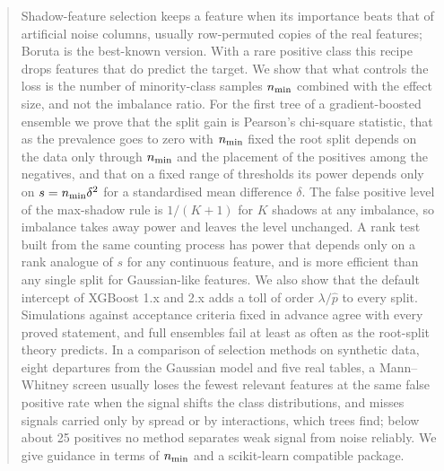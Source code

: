 \begin{abstract}
Shadow-feature selection keeps a feature when its importance beats that of artificial noise columns, usually row-permuted copies of the real features; Boruta is the best-known version. With a rare positive class this recipe drops features that do predict the target. We show that what controls the loss is the number of minority-class samples $\nmin$ combined with the effect size, and not the imbalance ratio. For the first tree of a gradient-boosted ensemble we prove that the split gain is Pearson's chi-square statistic, that as the prevalence goes to zero with $\nmin$ fixed the root split depends on the data only through $\nmin$ and the placement of the positives among the negatives, and that on a fixed range of thresholds its power depends only on $s = \nmin\delta^2$ for a standardised mean difference $\delta$. The false positive level of the max-shadow rule is $1/(K+1)$ for $K$ shadows at any imbalance, so imbalance takes away power and leaves the level unchanged. A rank test built from the same counting process has power that depends only on a rank analogue of $s$ for any continuous feature, and is more efficient than any single split for Gaussian-like features. We also show that the default intercept of XGBoost 1.x and 2.x adds a toll of order $\lambda/\hat p$ to every split. Simulations against acceptance criteria fixed in advance agree with every proved statement, and full ensembles fail at least as often as the root-split theory predicts. In a comparison of selection methods on synthetic data, eight departures from the Gaussian model and five real tables, a Mann--Whitney screen usually loses the fewest relevant features at the same false positive rate when the signal shifts the class distributions, and misses signals carried only by spread or by interactions, which trees find; below about 25 positives no method separates weak signal from noise reliably. We give guidance in terms of $\nmin$ and a scikit-learn compatible package.
\end{abstract}
